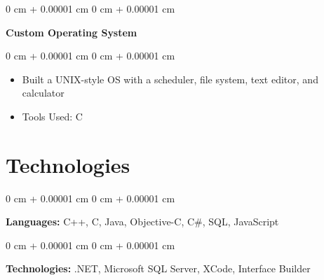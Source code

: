 \documentclass[10pt, letterpaper]{article}
\newenvironment{highlights}{
    \begin{itemize}[
        topsep=0.10 cm,
        parsep=0.10 cm,
        partopsep=0pt,
        itemsep=0pt,
        leftmargin=0 cm + 10pt
    ]
}{
    \end{itemize}
} %
\newenvironment{onecolentry}{
    \begin{adjustwidth}{
        0 cm + 0.00001 cm
    }{
        0 cm + 0.00001 cm
    }
}{
    \end{adjustwidth}
} %
\newenvironment{twocolentry}[2][]{
    \onecolentry
    \def\secondColumn{#2}
    \setcolumnwidth{\fill, 4.5 cm}
    \begin{paracol}{2}
}{
    \switchcolumn \raggedleft \secondColumn
    \end{paracol}
    \endonecolentry
} %
\begin{document}
\vspace{0.2 cm}

\begin{twocolentry}{
            2002
      }
      \textbf{Custom Operating System}\end{twocolentry}

\vspace{0.10 cm}
\begin{onecolentry}
      \begin{highlights}
            \item Built a UNIX-style OS with a scheduler, file system, text editor, and
            calculator
            \item Tools Used: C
      \end{highlights}
\end{onecolentry}

\section{Technologies}

\begin{onecolentry}
      \textbf{Languages:} C++, C, Java, Objective-C, C\#, SQL, JavaScript
\end{onecolentry}

\vspace{0.2 cm}

\begin{onecolentry}
      \textbf{Technologies:} .NET, Microsoft SQL Server, XCode, Interface Builder
\end{onecolentry}
\end{document}
